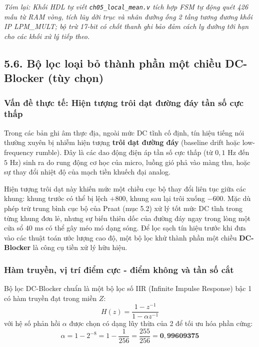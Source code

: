 \textit{Tóm lại: Khối HDL tự viết \texttt{ch05\_local\_mean.v} tích hợp FSM tự động quét 426 mẫu từ RAM vòng, tích lũy dời trục và nhân đường ống 2 tầng tương đương khối IP LPM\_MULT; bộ trừ 17-bit có chốt thanh ghi bảo đảm cách ly đường tới hạn cho các khối xử lý tiếp theo.}

\subsection*{5.6. Bộ lọc loại bỏ thành phần một chiều DC-Blocker (tùy chọn)}

\subsubsection*{Vấn đề thực tế: Hiện tượng trôi dạt đường đáy tần số cực thấp}
Trong các bản ghi âm thực địa, ngoài mức DC tĩnh cố định, tín hiệu tiếng nói thường xuyên bị nhiễm hiện tượng \textbf{trôi dạt đường đáy} (baseline drift hoặc low-frequency rumble). Đây là các dao động điện áp tần số cực thấp (từ $0{,}1\text{ Hz}$ đến $5\text{ Hz}$) sinh ra do rung động cơ học của micro, luồng gió phả vào màng thu, hoặc sự thay đổi nhiệt độ của mạch tiền khuếch đại analog.

Hiện tượng trôi dạt này khiến mức một chiều cục bộ thay đổi liên tục giữa các khung: khung trước có thể bị lệch $+800$, khung sau lại trôi xuống $-600$. Mặc dù phép trừ trung bình cục bộ của Praat (mục 5.2) xử lý tốt mức DC tĩnh trong từng khung đơn lẻ, nhưng sự biến thiên dốc của đường đáy ngay trong lòng một cửa sổ $40\text{ ms}$ có thể gây méo mó dạng sóng. Để lọc sạch tín hiệu trước khi đưa vào các thuật toán ước lượng cao độ, một bộ lọc khử thành phần một chiều \textbf{DC-Blocker} là công cụ tiền xử lý hữu hiệu.

\subsubsection*{Hàm truyền, vị trí điểm cực - điểm không và tần số cắt}
Bộ lọc DC-Blocker chuẩn là một bộ lọc số IIR (Infinite Impulse Response) bậc 1 có hàm truyền đạt trong miền $Z$:
\begin{equation}
H(z) = \frac{1 - z^{-1}}{1 - \alpha z^{-1}}
\end{equation}
với hệ số phản hồi $\alpha$ được chọn có dạng lũy thừa của 2 để tối ưu hóa phần cứng:
\begin{equation}
\alpha = 1 - 2^{-8} = 1 - \frac{1}{256} = \frac{255}{256} = \mathbf{0{,}99609375}
\end{equation}

